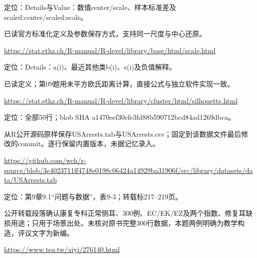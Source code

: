 \par\noindent\begin{minipage}{\linewidth}\label{src:R-SCALE}
\par
定位：Details与Value：数值center/scale、样本标准差及scaled:center/scaled:scale。\par
已读官方标准化定义及参数保存方式，支持同一尺度与中心还原。\par
{\small\url{https://stat.ethz.ch/R-manual/R-devel/library/base/html/scale.html}}\par
\end{minipage}\par\medskip

\par\noindent\begin{minipage}{\linewidth}\label{src:R-SILHOUETTE}
\par
定位：Details：a(i)、最近其他类b(i)、s(i)及负值解释。\par
已读定义；第09题用未平方欧氏距离计算，直接公式与独立软件实现一致。\par
{\small\url{https://stat.ethz.ch/R-manual/R-devel/library/cluster/html/silhouette.html}}\par
\end{minipage}\par\medskip

\par\noindent\begin{minipage}{\linewidth}\label{src:R-USARRESTS-DATA}
\par
定位：全部50行；blob SHA a1470eef30efe3fd88b590712bcd84ad1269dbca。\par
从R公开源码原样保存USArrests.tab与USArrests.csv；固定到该数据文件最后修改的commit。逐行保留内置版本，未据记忆录入。\par
{\small\url{https://github.com/wch/r-source/blob/3e4023711ff4748e0198c06424a14929ba31906f/src/library/datasets/data/USArrests.tab}}\par
\end{minipage}\par\medskip

\par\noindent\begin{minipage}{\linewidth}\label{src:HU-EAR-EXCERPT}
\par
定位：第9章9.1“问题与数据”，表9-3；转载标217–219页。\par
公开转载段落确认康复专科正常侧耳、300例、EC/EK/EZ及两个指数、修复耳缺损用途；只用于场景出处。未核对原书完整300行数据，本题两例明确为教学构造，评议文字为新编。\par
{\small\url{https://www.tsu.tw/xiyi/276140.html}}\par
\end{minipage}\par\medskip

